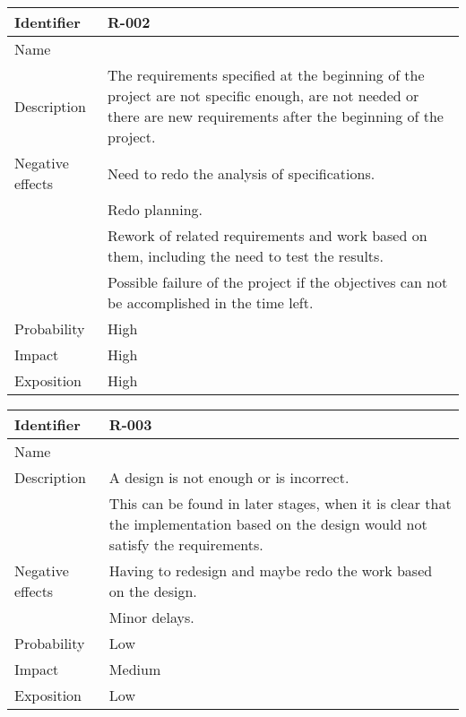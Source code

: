 \begin{table}[H]
	\begin{tabularx}{\textwidth}{|l|X|}
		\hline
		\rowcolor{gray!30}
		Identifier & \textbf{R-002} \\ \hline
		Name & \Rdos \\ \hline
		Description & The requirements specified at the beginning of the project are not specific enough, are not needed or there are new requirements after the beginning of the project. \\ \hline
		Negative effects
			& Need to redo the analysis of specifications. \\
			& Redo planning.  \\
			& Rework of related requirements and work based on them, including the need to test the results. \\
			& Possible failure of the project if the objectives can not be accomplished in the time left. \\ \hline
		Probability & High\\ \hline
		Impact &  High\\ \hline
		Exposition &  High\\ \hline
	\end{tabularx}
\end{table}

\begin{table}[H]
	\begin{tabularx}{\textwidth}{|l|X|}
		\hline
		\rowcolor{gray!30}
		Identifier & \textbf{R-003} \\ \hline
		Name & \Rtres \\ \hline
		Description
			& A design is not enough or is incorrect. \\
			& This can be found in later stages, when it is clear that the implementation based on the design would not satisfy the requirements. \\ \hline
		Negative effects
			& Having to redesign and maybe redo the work based on the design. \\
			& Minor delays. \\ \hline
		Probability & Low\\ \hline
		Impact &  Medium\\ \hline
		Exposition & Low\\ \hline
	\end{tabularx}
\end{table}

